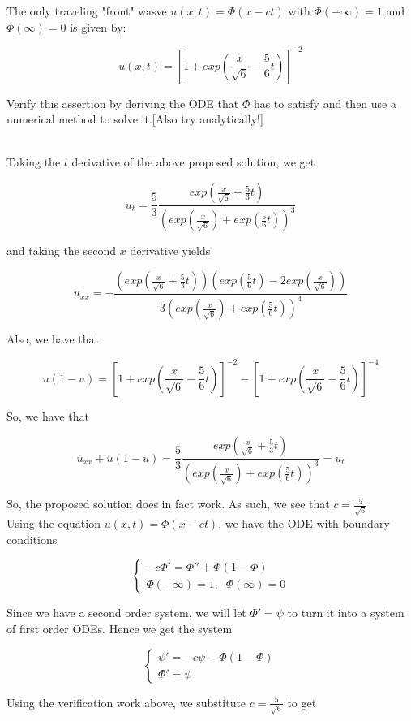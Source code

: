 The only traveling "front" wasve $u(x,t) = \Phi(x - ct)$ with $\Phi(-\infty)=1$ and $\Phi(\infty)=0$
is given by:

$$u(x,t) = [1+exp(\frac{x}{\sqrt{6}} - \frac56t)]^{-2}$$

Verify this assertion by deriving the ODE that $\Phi$ has to satisfy and then use a numerical method to
solve it.[Also try analytically!]\\

\begin{solution}\renewcommand{\qedsymbol}{}\ \\
    Taking the $t$ derivative of the above proposed solution, we get

    $$u_t=\frac53\frac{exp(\frac{x}{\sqrt{6}}+\frac53t)}{(exp(\frac{x}{\sqrt{6}})+exp(\frac56t))^3}$$

    and taking the second $x$ derivative yields

    $$u_{xx}=-\frac{(exp(\frac{x}{\sqrt{6}} + \frac53t))(exp(\frac56t)-2exp(\frac{x}{\sqrt{6}}))}
    {3(exp(\frac{x}{\sqrt{6}})+exp(\frac56t))^4}$$

    Also, we have that

    $$u(1-u)=[1+exp(\frac{x}{\sqrt{6}} - \frac56t)]^{-2}-[1+exp(\frac{x}{\sqrt{6}} - \frac56t)]^{-4}$$

    So, we have that

    $$u_{xx}+u(1-u)=\frac53\frac{exp(\frac{x}{\sqrt{6}}+\frac53t)}
    {(exp(\frac{x}{\sqrt{6}})+exp(\frac56t))^3}=u_t$$

    So, the proposed solution does in fact work. As such, we see that $c=\frac{5}{\sqrt6}$\\
    Using the equation $u(x,t) = \Phi(x - ct)$, we have the ODE with boundary conditions

    $$\begin{cases}
        -c\Phi' = \Phi'' + \Phi(1-\Phi) \\
        \Phi(-\infty) = 1,\;\; \Phi(\infty) = 0
    \end{cases}$$

    Since we have a second order system, we will let $\Phi'=\psi$ to turn it into a system of first
    order ODEs. Hence we get the system

    $$\begin{cases}
        \psi' = -c\psi - \Phi(1-\Phi) \\
        \Phi' = \psi
    \end{cases}$$

     Using the verification work above, we substitute $c=\frac{5}{\sqrt6}$ to get


\end{solution}
